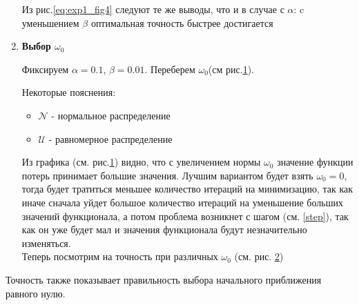 \begin{enumerate}
	Из рис.\ref{eq:exp1_fig4} следуют те же выводы, что и в случае с $\alpha$: c уменьшением $\beta$ оптимальная точность быстрее достигается

	\item{\bfseries  Выбор $\omega_0$}
	
	Фиксируем $\alpha = 0.1$, $\beta = 0.01$. Переберем $\omega_0$(см рис.\ref{eq:exp1_fig7}).
	\begin{figure}[h]		
		\caption{}
		\label{eq:exp1_fig7}
	\end{figure}

	Некоторые пояснения:
	\begin{itemize}
		\item $\mathcal{N}$ - нормальное распределение
		\item $\mathcal{U}$ - равномерное распределение
	\end{itemize}
	Из графика (см. рис.\ref{eq:exp1_fig7}) видно, что с увеличением нормы $\omega_0$ значение функции потерь принимает большие значения. Лучшим вариантом будет взять $\omega_0 = 0$, тогда будет тратиться меньшее количество итераций на минимизацию, так как иначе сначала уйдет большое количество итераций на уменьшение больших значений функционала, а потом проблема возникнет с шагом (см. \ref{step}), так как он уже будет мал и значения функционала будут незначительно изменяться.\\
	Теперь посмотрим на точность при различных $\omega_0$ (см. рис. \ref{eq:exp1_fig8})
	\begin{figure}[h]		
		\caption{}
		\label{eq:exp1_fig8}
	\end{figure}
\end{enumerate}
Точность также показывает правильность выбора начального приближения равного нулю.
